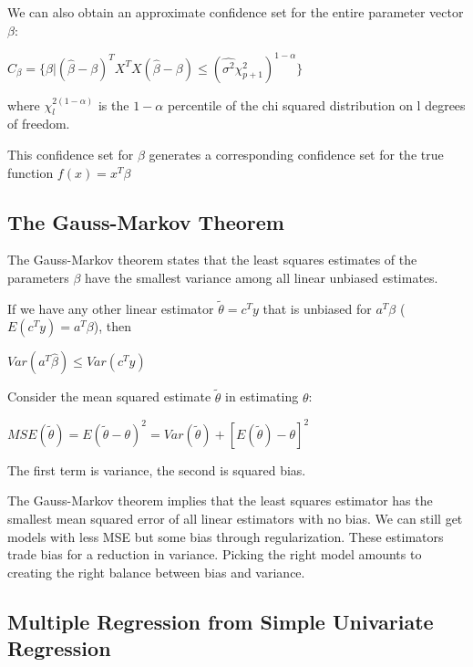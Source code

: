 \documentclass[11pt]{article}
\begin{document}
We can also obtain an approximate confidence set for the entire parameter vector \(\beta\): 

\(C_{\beta} = \{\beta | (\hat{\beta} - \beta)^T X^TX(\hat{\beta} - \beta) \leq (\hat{\sigma^2}\chi_{p + 1}^2)^{1 - \alpha}\}\)

where \(\chi_l^{2(1-\alpha)}\) is the \(1 - \alpha\) percentile of the chi squared distribution on l degrees of freedom. 

This confidence set for \(\beta\) generates a corresponding confidence set for the true function \(f(x) = x^T\beta\)

\subsection{The Gauss-Markov Theorem}
\label{sec:orgcb07606}

The Gauss-Markov theorem states that the least squares estimates of the parameters \(\beta\) have the smallest variance among all linear unbiased estimates.

If we have any other linear estimator \(\tilde{\theta} = c^Ty\) that is unbiased for \(a^T\beta\) (\(E(c^Ty) = a^T\beta\)), then 

\(Var(a^T\hat{\beta}) \leq Var(c^Ty)\)

Consider the mean squared estimate \(\tilde{\theta}\) in estimating \(\theta\):

\(MSE(\tilde{\theta}) = E(\tilde{\theta} -\theta)^2 = Var(\tilde{\theta}) + [E(\tilde{\theta}) - \theta]^2\)

The first term is variance, the second is squared bias. 

The Gauss-Markov theorem implies that the least squares estimator has the smallest mean squared error of all linear estimators with no bias. We can still get models with less MSE but some bias through regularization. These estimators trade bias for a reduction in variance. Picking the right model amounts to creating the right balance between bias and variance. 

\subsection{Multiple Regression from Simple Univariate Regression}
\label{sec:org0ea1aa8}
\end{document}
